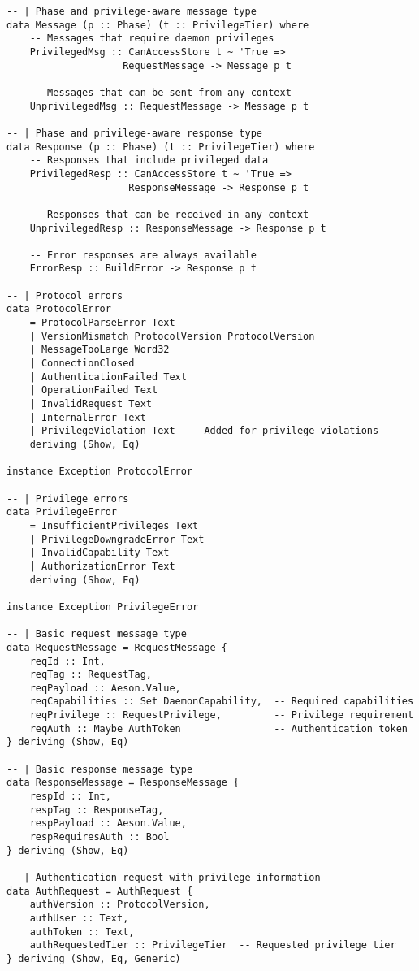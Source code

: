 \documentclass{article}
\begin{document}
\begin{tcolorbox}[title=Ten/Daemon/Protocol.hs Changes]
\begin{verbatim}
-- | Phase and privilege-aware message type
data Message (p :: Phase) (t :: PrivilegeTier) where
    -- Messages that require daemon privileges
    PrivilegedMsg :: CanAccessStore t ~ 'True =>
                    RequestMessage -> Message p t

    -- Messages that can be sent from any context
    UnprivilegedMsg :: RequestMessage -> Message p t

-- | Phase and privilege-aware response type
data Response (p :: Phase) (t :: PrivilegeTier) where
    -- Responses that include privileged data
    PrivilegedResp :: CanAccessStore t ~ 'True =>
                     ResponseMessage -> Response p t

    -- Responses that can be received in any context
    UnprivilegedResp :: ResponseMessage -> Response p t

    -- Error responses are always available
    ErrorResp :: BuildError -> Response p t

-- | Protocol errors
data ProtocolError
    = ProtocolParseError Text
    | VersionMismatch ProtocolVersion ProtocolVersion
    | MessageTooLarge Word32
    | ConnectionClosed
    | AuthenticationFailed Text
    | OperationFailed Text
    | InvalidRequest Text
    | InternalError Text
    | PrivilegeViolation Text  -- Added for privilege violations
    deriving (Show, Eq)

instance Exception ProtocolError

-- | Privilege errors
data PrivilegeError
    = InsufficientPrivileges Text
    | PrivilegeDowngradeError Text
    | InvalidCapability Text
    | AuthorizationError Text
    deriving (Show, Eq)

instance Exception PrivilegeError

-- | Basic request message type
data RequestMessage = RequestMessage {
    reqId :: Int,
    reqTag :: RequestTag,
    reqPayload :: Aeson.Value,
    reqCapabilities :: Set DaemonCapability,  -- Required capabilities
    reqPrivilege :: RequestPrivilege,         -- Privilege requirement
    reqAuth :: Maybe AuthToken                -- Authentication token
} deriving (Show, Eq)

-- | Basic response message type
data ResponseMessage = ResponseMessage {
    respId :: Int,
    respTag :: ResponseTag,
    respPayload :: Aeson.Value,
    respRequiresAuth :: Bool
} deriving (Show, Eq)

-- | Authentication request with privilege information
data AuthRequest = AuthRequest {
    authVersion :: ProtocolVersion,
    authUser :: Text,
    authToken :: Text,
    authRequestedTier :: PrivilegeTier  -- Requested privilege tier
} deriving (Show, Eq, Generic)


\end{verbatim}
\end{tcolorbox}
\end{document}
